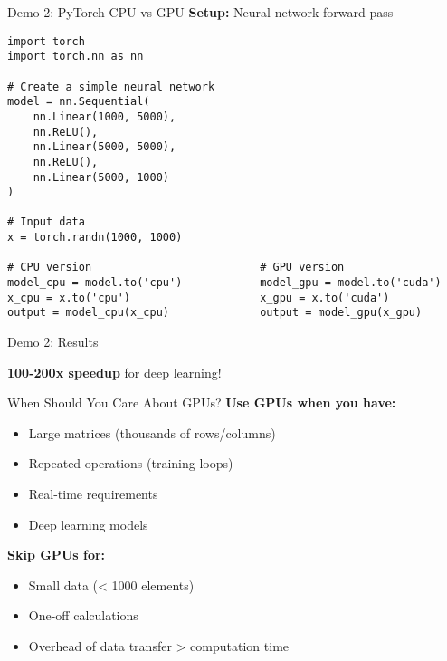 \documentclass[10pt]{beamer}
\begin{document}
\begin{frame}[fragile]{Demo 2: PyTorch CPU vs GPU}
  \textbf{Setup:} Neural network forward pass
  
  \vspace{0.5em}
  \tiny
\begin{verbatim}
import torch
import torch.nn as nn

# Create a simple neural network
model = nn.Sequential(
    nn.Linear(1000, 5000),
    nn.ReLU(),
    nn.Linear(5000, 5000),
    nn.ReLU(),
    nn.Linear(5000, 1000)
)

# Input data
x = torch.randn(1000, 1000)

# CPU version                          # GPU version
model_cpu = model.to('cpu')            model_gpu = model.to('cuda')
x_cpu = x.to('cpu')                    x_gpu = x.to('cuda')
output = model_cpu(x_cpu)              output = model_gpu(x_gpu)
\end{verbatim}
\end{frame}

\begin{frame}{Demo 2: Results}
  \begin{center}
  \end{center}
  
  \vspace{1em}
  \centering
  \Large \textbf{100-200x speedup} for deep learning!
\end{frame}

\begin{frame}{When Should You Care About GPUs?}
  \textbf{Use GPUs when you have:}
  
  \vspace{1em}
  \begin{itemize}
    \item Large matrices (thousands of rows/columns)
    \item Repeated operations (training loops)
    \item Real-time requirements
    \item Deep learning models
  \end{itemize}
  
  \vspace{1em}
  \textbf{Skip GPUs for:}
  \begin{itemize}
    \item Small data (< 1000 elements)
    \item One-off calculations
    \item Overhead of data transfer > computation time
  \end{itemize}
\end{frame}
\end{document}
